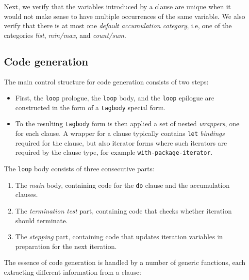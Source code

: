 Next, we verify that the variables introduced by a clause are unique
when it would not make sense to have multiple occurrences of the same
variable.  We also verify that there is at most one \emph{default
accumulation category}, i.e, one of the categories \emph{list},
\emph{min/max}, and \emph{count/sum}.

\subsection{Code generation}
\label{sec-our-technique-code generation}

The main control structure for code generation consists of two steps:

\begin{itemize}
\item First, the \texttt{loop} prologue, the \texttt{loop} body, and
  the \texttt{loop} epilogue are constructed in the form of a
  \texttt{tagbody} special form.
\item To the resulting \texttt{tagbody} form is then applied a set of
  nested \emph{wrappers}, one for each clause.  A wrapper for a clause
  typically contains \texttt{let} \emph{bindings} required for the
  clause, but also iterator forms where such iterators are required by
  the clause type, for example \texttt{with-package-iterator}.
\end{itemize}

The \texttt{loop} body consists of three consecutive parts:

\begin{enumerate}
\item The \emph{main} body, containing code for the \texttt{do} clause
  and the accumulation clauses.
\item The \emph{termination test} part, containing code that checks
  whether iteration should terminate.
\item The \emph{stepping} part, containing code that updates iteration
  variables in preparation for the next iteration.
\end{enumerate}

The essence of code generation is handled by a number of generic
functions, each extracting different information from a clause:

